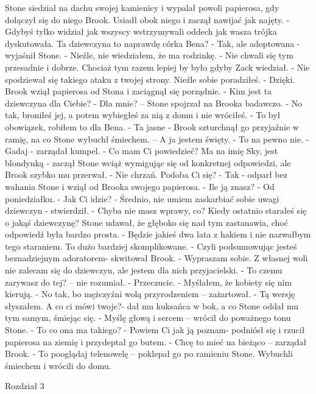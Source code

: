 \documentclass[12pt,a4paper]{book}
\begin{document}
Stone siedział na dachu swojej kamienicy i wypalał powoli papierosa, gdy dołączył się do niego Brook. Usiadł obok niego i zaczął nawijać jak najęty.
- Gdybyś tylko widział jak wszyscy wstrzymywali oddech jak wasza trójka dyskutowała. Ta dziewczyna to naprawdę córka Bena?
- Tak, ale adoptowana - wyjaśnił Stone.
- Nieźle, nie wiedziałem, że ma rodzinkę. 
- Nie chwali się tym przesadnie i dobrze. Chociaż tym razem lepiej by było gdyby Zack wiedział. 
- Nie spodziewał się takiego ataku z twojej strony. Nieźle sobie poradziłeś.
- Dzięki.
Brook wziął papierosa od Stona i zaciągnął się porządnie.
- Kim jest ta dziewczyna dla Ciebie?
- Dla mnie? – Stone spojrzał na Brooka badawczo. 
- No tak, broniłeś jej, a potem wybiegłeś za nią z domu i nie wróciłeś. 
- To był obowiązek, robiłem to dla Bena.
- Ta jasne - Brook szturchnął go przyjaźnie w ramię, na co Stone wybuchł śmiechem. – A ja jestem święty. 
- To na pewno nie. 
- Gadaj - zarządał kumpel.
- Co mam Ci powiedzieć? Ma na imię Sky, jest blondynką - zaczął Stone wciąż wymigując się od konkretnej odpowiedzi, ale Brook szybko mu przerwał. 
- Nie chrzań. Podoba Ci się?
- Tak - odparł bez wahania Stone i wziął od Brooka swojego papierosa. 
- Ile ją znasz?
- Od poniedziałku. 
- Jak Ci idzie?
- Średnio, nie umiem zaskarbiać sobie uwagi dziewczyn - stwierdził.
- Chyba nie masz wprawy, co? Kiedy ostatnio starałeś się o jakąś dziewczynę?
Stone udawał, że głęboko się nad tym zastanawia, choć odpowiedź była bardzo prosta. 
- Będzie jakieś dwa lata z hakiem i nie nazwałbym tego staraniem. To dużo bardziej skomplikowane. 
- Czyli podsumowując jesteś beznadziejnym adoratorem- skwitował Brook.
- Wypraszam sobie. Z własnej woli nie zalecam się do dziewczyn, ale jestem dla nich przyjacielski.
- To czemu zarywasz do tej? – nie rozumiał.
- Przeczucie. 
- Myślałem, że kobiety się nim kierują. 
- No tak, bo mężczyźni wolą przyrodzeniem – zażartował.
- Tą wersję słyszałem. A co ci mówi twoje?- dał mu kuksańca w bok, a co Stone oddał mu tym samym, śmiejąc się.
- Myślę głową i sercem – wrócił do poważnego tonu Stone.
- To co ona ma takiego?
- Powiem Ci jak ją poznam- podniósł się i rzucił papierosa na ziemię i przydeptał go butem.
- Chcę to mieć na bieżąco – zarządał Brook. 
- To pooglądaj telenowelę – poklepał go po ramieniu Stone. 
Wybuchli śmiechem i wrócili do domu. 



Rozdział 3
\end{document}
